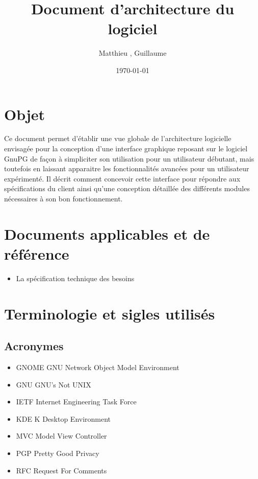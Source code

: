 \documentclass{../res/univ-projet}
\title{Document d'architecture du logiciel}
\author{Matthieu \bsc{Fin}, Guillaume \bsc{Leroy}}
\date{\today}
\begin{document}
\maketitle
\newpage
\tableofcontents
\newpage

\section{Objet}
  Ce document permet d'établir une vue globale de l'architecture logicielle envisagée pour la conception d'une interface graphique reposant sur le logiciel GnuPG de façon à simpliciter son utilisation pour un utilisateur débutant, mais toutefois en laissant apparaitre les fonctionnalités avancées pour un utilisateur expérimenté. Il décrit comment concevoir cette interface pour répondre aux spécifications du client ainsi qu'une conception détaillée des différents modules nécessaires à son bon fonctionnement. 

\section{Documents applicables et de référence}
  \begin{itemize}
    \item La spécification technique des besoins
  \end{itemize}

\section{Terminologie et sigles utilisés}
  \subsection{Acronymes}
    \begin{itemize}
      \item GNOME GNU Network Object Model Environment
      \item GNU GNU's Not UNIX
      \item IETF Internet Engineering Task Force
      \item KDE K Desktop Environment
      \item MVC Model View Controller
      \item PGP Pretty Good Privacy
      \item RFC Request For Comments
    \end{itemize}
\end{document}
